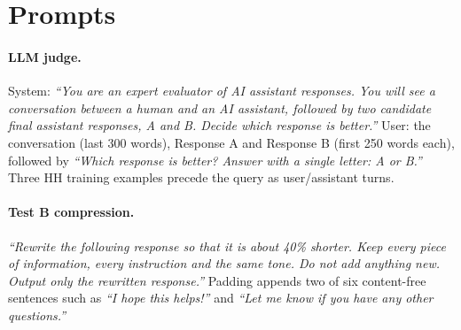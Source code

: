 \documentclass[11pt]{article}
\begin{document}
\begin{table}[h]
\centering
\small
{}
\caption{Training hyperparameters. All use AdamW with weight decay 0.01 and gradient clipping at 1.0; transformers are validated every 1,000 optimizer steps. The token budget is 128 prompt and 2$\times$190 response tokens. Bi-encoder: as BERT.}
\end{table}

\section{Prompts}
\label{app:prompts}

\paragraph{LLM judge.} System: \emph{``You are an expert evaluator of AI assistant responses. You will see a conversation between a human and an AI assistant, followed by two candidate final assistant responses, A and B. Decide which response is better.''} User: the conversation (last 300 words), Response A and Response B (first 250 words each), followed by \emph{``Which response is better? Answer with a single letter: A or B.''} Three HH training examples precede the query as user/assistant turns.

\paragraph{Test B compression.} \emph{``Rewrite the following response so that it is about 40\% shorter. Keep every piece of information, every instruction and the same tone. Do not add anything new. Output only the rewritten response.''} Padding appends two of six content-free sentences such as \emph{``I hope this helps!''} and \emph{``Let me know if you have any other questions.''}
\end{document}
